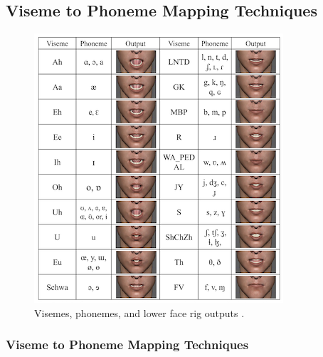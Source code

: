 \documentclass[12pt]{article}
\begin{document}
\subsection{Viseme to Phoneme Mapping Techniques}


\begin{figure}
\centering
\vspace{-5mm}
\includegraphics[width=\linewidth]{visemenet.png}
\caption{Visemes, phonemes, and lower face rig outputs \cite{Zhou2018visemenet}.}
\label{fig:viseme-mapping}
\end{figure}
\subsubsection{Viseme to Phoneme Mapping Techniques}
\end{document}
